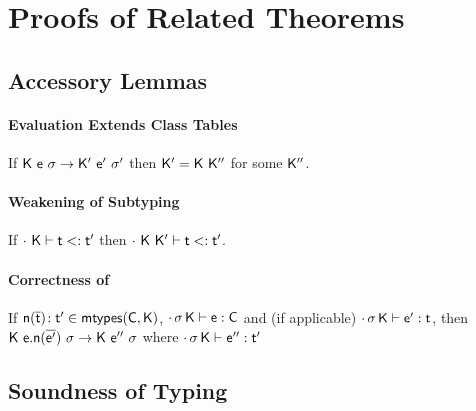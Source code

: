\documentclass[a4paper,USenglish]{tex/lipics-v2016}
\begin{document}





\section{Proofs of Related Theorems}
\subsection{Accessory Lemmas}

\paragraph{Evaluation Extends Class Tables}

If $\Reduce \K\e\s \Kp\ep\sp$ then $\Kp = \K~\Kpp$ for some $\Kpp$.

\paragraph{Weakening of Subtyping}

If $\StrSub\cdot\K\t\tp$ then $\StrSub\cdot{\K~\Kp}\t\tp$.

\paragraph{Correctness of \classoff{\C}{\K}}

If $\Mtype\n{\b\t}\tp \in \classoff{\C}{\K}$, $\EnvType\cdot\s\K\e\C$ and (if applicable) $\EnvType\cdot\s\K\ep\t$, then $\Reduce \K{\Call\e\n{\b\ep}}\s \K\epp\s$ where $\EnvType\cdot\s\K\epp\tp$

\subsection{Soundness of \kafka Typing}
\end{document}
